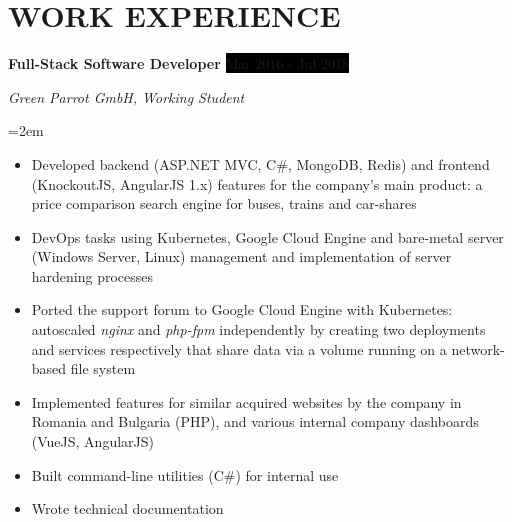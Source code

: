 \documentclass[paper=a4,fontsize=11pt]{scrartcl} %
\newcommand{\sepspace}{\vspace*{1em}}		%
\newcommand{\NewPart}[1]{\section*{\uppercase{#1}}}
\newcommand{\EducationEntry}[4]{
		\noindent \textbf{#1} \hfill      %
		\colorbox{Black}{%
			\parbox{6em}{%
			\hfill\color{White}#2}} \par  %
		\noindent \textit{#3} \par        %
		\noindent\hangindent=2em\hangafter=0 \small #4 %
		\normalsize \par}
\newcommand{\WorkEntry}[4]{				  %
		\noindent \textbf{#1} \hfill      %
		\colorbox{Black}{\color{White}#2} \par  %
		\noindent \textit{#3} \par              %
		\noindent\hangindent=2em\hangafter=0 \small #4 %
		\normalsize \par}
\begin{document}
\NewPart{Work experience}{}

\WorkEntry{Full-Stack Software Developer}{Mar 2016 - Jul 2018}{Green Parrot GmbH, Working Student}{\begin{itemize}
    \item Developed backend (ASP.NET MVC, C\#, MongoDB, Redis) and frontend (KnockoutJS, AngularJS 1.x) features for the company’s main product: a price comparison search engine for buses, trains and car-shares
    \item DevOps tasks using Kubernetes, Google Cloud Engine and bare-metal server (Windows Server, Linux) management and implementation of server hardening processes
    \item Ported the support forum to Google Cloud Engine with Kubernetes: autoscaled \emph{nginx} and \emph{php-fpm} independently by creating two deployments and services respectively that share data via a volume running on a network-based file system
    \item Implemented features for similar acquired websites by the company in Romania and Bulgaria (PHP), and various internal company dashboards (VueJS, AngularJS)
    \item Built command-line utilities (C\#) for internal use
    \item Wrote technical documentation
\end{itemize}}
\sepspace
\end{document}
